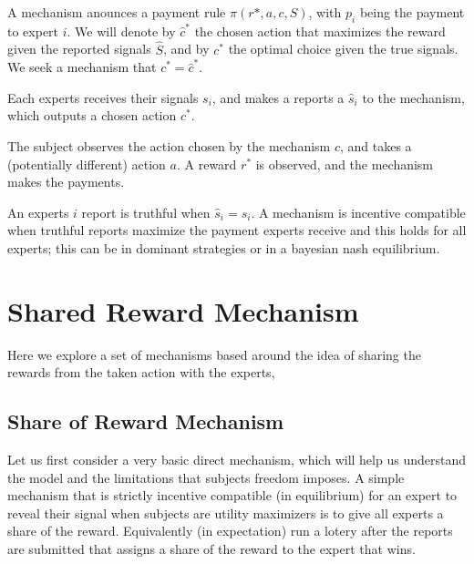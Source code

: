 A mechanism anounces a payment rule $\pi(r*,a,c,S)$, with $p_i$ being the payment to expert $i$. We will denote by $\hat{c}^{*}$ the chosen action that maximizes the reward given the reported signals $\hat{S}$, and by $c^{*}$ the optimal choice given the true signals.
We seek a mechanism that  $c^{*} = \hat{c}^{*}$.

Each experts receives their signals $s_i$, and makes a reports a $\hat{s}_i$ to the mechanism, which outputs a chosen action $c^{*}$.

The subject observes the action chosen by the mechanism $c$, and takes a (potentially different) action $a$. A reward $r^{*}$ is observed, and the mechanism makes the payments.


%


An experts $i$ report is truthful when $\hat{s}_i=s_i$. A mechanism is incentive compatible when truthful reports maximize the payment experts receive and this holds for all experts; this can be in dominant strategies or in a bayesian nash equilibrium.

\section{Shared Reward Mechanism}

Here we explore a set of mechanisms based around the idea of sharing the rewards from the taken action with the experts, 

\subsection{Share of Reward Mechanism}

Let us first consider a very basic direct mechanism, which will help us understand the model and the limitations that subjects freedom imposes. 
A simple mechanism that is strictly incentive compatible (in equilibrium) for an expert to reveal their signal when subjects are utility maximizers is to give all experts a share of the reward. Equivalently (in expectation) run a lotery after the reports are submitted that assigns a share of the reward to the expert that wins. 

